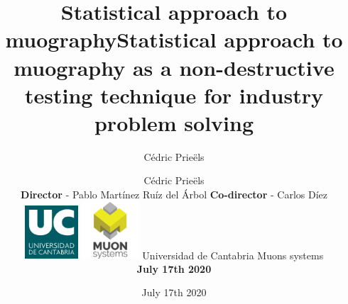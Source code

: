 \documentclass[8 pt]{beamer}
\title{Statistical approach to muography}
\date{July 17th 2020}
\author{C\'{e}dric Prie\"els}
\begin{document}
\begin{frame}
\vspace{-15pt} 
\title{Statistical approach to muography as a non-destructive \\ testing technique for industry problem solving}
\author{C\'{e}dric Prie\"els \\ \vspace{10pt} \textbf{Director} - Pablo Mart\'inez Ru\'iz del \'Arbol \newline \textbf{Co-director} - Carlos D\'iez \\ \vspace{20pt} \includegraphics[width= 0.15\textwidth]{figs/image_UC.png} \hspace{10pt} \includegraphics[width= 0.16\textwidth]{figs/muonSystems.png} \newline \vspace{20pt} Universidad de Cantabria \newline Muons systems \newline  \begin{center} \large{\textbf{July 17th 2020}} \end{center}}

\date{}
\vspace{15pt}
\maketitle

\centering
  
\end{frame}
\end{document}
